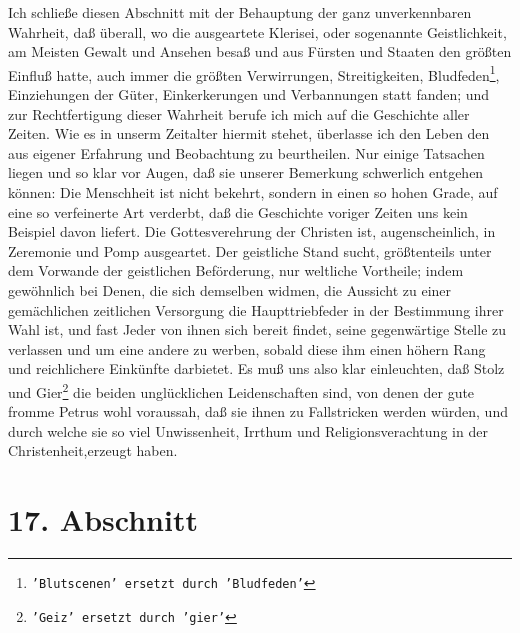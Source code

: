 Ich schließe diesen Abschnitt mit der Behauptung der ganz unverkennbaren
Wahrheit, daß überall, wo die ausgeartete Klerisei, oder sogenannte
Geistlichkeit, am Meisten Gewalt und Ansehen besaß und aus Fürsten und
Staaten den größten Einfluß hatte, auch immer die größten Verwirrungen,
Streitigkeiten, Bludfeden\footnote{\texttt{'Blutscenen' ersetzt durch 'Bludfeden'}}, Einziehungen der Güter, Einkerkerungen und
Verbannungen statt fanden; und zur Rechtfertigung dieser Wahrheit berufe ich
mich auf die Geschichte aller Zeiten. Wie es in unserm Zeitalter hiermit stehet,
überlasse ich den Leben den aus eigener Erfahrung und Beobachtung zu
beurtheilen. Nur einige Tatsachen liegen und so klar vor Augen, daß sie unserer
Bemerkung schwerlich entgehen können: Die Menschheit ist nicht bekehrt, sondern
in einen so hohen Grade, auf eine so verfeinerte Art verderbt, daß die
Geschichte voriger Zeiten uns kein Beispiel davon liefert. Die Gottesverehrung
der Christen ist, augenscheinlich, in Zeremonie und Pomp ausgeartet. Der
geistliche Stand sucht, größtenteils unter dem Vorwande der geistlichen
Beförderung, nur weltliche Vortheile; indem gewöhnlich bei Denen, die sich
demselben widmen, die Aussicht zu einer gemächlichen zeitlichen Versorgung die
Haupttriebfeder in der Bestimmung ihrer Wahl ist, und fast Jeder von ihnen sich
bereit findet, seine gegenwärtige Stelle zu verlassen und um eine andere zu
werben, sobald diese ihm einen höhern Rang und reichlichere Einkünfte darbietet.
Es muß uns also klar einleuchten, daß Stolz und Gier\footnote{\texttt{'Geiz' ersetzt durch 'gier'}} die beiden unglücklichen
Leidenschaften sind, von denen der gute fromme Petrus wohl voraussah, daß sie
ihnen zu Fallstricken werden würden, und durch welche sie so viel Unwissenheit,
Irrthum und Religionsverachtung in der Christenheit,erzeugt haben.

\section{17. Abschnitt} \label{kap7_ab17}

